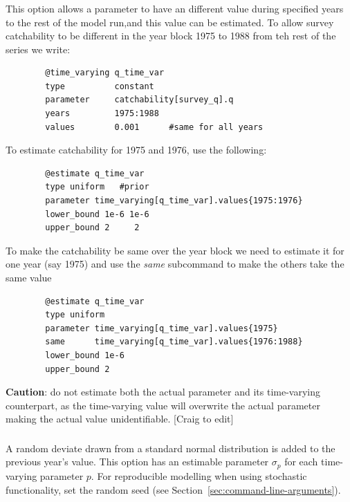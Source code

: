 \subsubsection[Constant (year blocks)]{}

This option allows a parameter to have an different value during specified years to the rest of the model run,and this value can be estimated. To allow survey catchability to be different in the year block 1975 to 1988 from teh rest of the series we write:

{\small{\begin{verbatim}
		@time_varying q_time_var
		type          constant
		parameter     catchability[survey_q].q
		years         1975:1988
		values        0.001      #same for all years
		\end{verbatim}}}

To estimate catchability for 1975 and 1976, use the following:

{\small{\begin{verbatim}
		@estimate q_time_var
		type uniform   #prior
		parameter time_varying[q_time_var].values{1975:1976}
		lower_bound 1e-6 1e-6
		upper_bound 2     2
		\end{verbatim}}}

To make the catchability be same over the year block we need to estimate it for one year (say 1975) and use the \textit{same} subcommand to make the others take the same value

{\small{\begin{verbatim}
		@estimate q_time_var
		type uniform
		parameter time_varying[q_time_var].values{1975}
		same      time_varying[q_time_var].values{1976:1988}
		lower_bound 1e-6
		upper_bound 2
		\end{verbatim}}}
		
\textbf{Caution}: do not estimate both the actual parameter and its time-varying counterpart, as the time-varying value will overwrite the actual parameter making the actual value unidentifiable. [Craig to edit]

\subsubsection[Random Walk]{}

A random deviate drawn from a standard normal distribution is added to the previous year's value. This option has an estimable parameter $\sigma_p$ for each time-varying parameter $p$. For reproducible modelling when using stochastic functionality, set the random seed (see Section~\ref{sec:command-line-arguments}).


